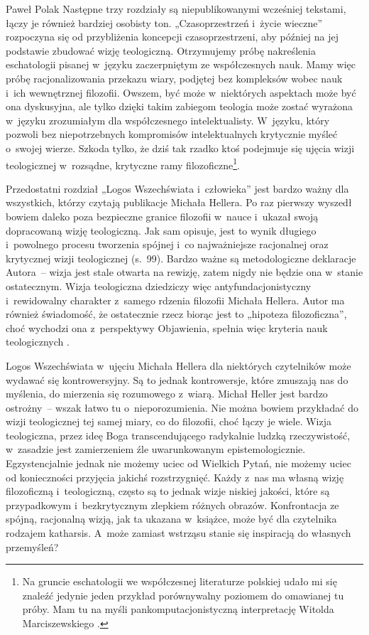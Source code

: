 \begin{recplenv}{Paweł Polak}
Następne trzy rozdziały są niepublikowanymi wcześniej tekstami, łączy je również bardziej osobisty ton.
„Czasoprzestrzeń i~życie wieczne” rozpoczyna się od przybliżenia koncepcji czasoprzestrzeni, aby później na jej
podstawie zbudować wizję teologiczną. Otrzymujemy próbę nakreślenia eschatologii pisanej w~języku zaczerpniętym ze
współczesnych nauk. Mamy więc próbę racjonalizowania przekazu wiary, podjętej bez kompleksów wobec nauk i~ich
wewnętrznej filozofii. Owszem, być może w~niektórych aspektach może być ona dyskusyjna, ale tylko dzięki takim zabiegom
teologia może zostać wyrażona w~języku zrozumiałym dla współczesnego intelektualisty. W~języku, który pozwoli bez
niepotrzebnych kompromisów intelektualnych krytycznie myśleć o~swojej wierze. Szkoda tylko, że dziś tak rzadko ktoś
podejmuje się ujęcia wizji teologicznej w~rozsądne, krytyczne ramy filozoficzne\footnote{Na gruncie eschatologii we
współczesnej literaturze polskiej udało mi się znaleźć jedynie jeden przykład porównywalny poziomem do omawianej tu
próby. Mam tu na myśli pankomputacjonistyczną interpretację Witolda Marciszewskiego
\parencite*{marciszewski_wszechswiat_1999}.
}.  

Przedostatni rozdział „Logos Wszechświata i~człowieka” jest bardzo ważny dla wszystkich, którzy czytają publikacje
Michała Hellera. Po raz pierwszy wyszedł bowiem daleko poza bezpieczne granice filozofii w~nauce i~ukazał swoją
dopracowaną wizję teologiczną. Jak sam opisuje, jest to wynik długiego i~powolnego procesu tworzenia spójnej i~co
najważniejsze racjonalnej oraz krytycznej wizji teologicznej (s.~99). Bardzo ważne są metodologiczne deklaracje
Autora~-- wizja jest stale otwarta na rewizję, zatem nigdy nie będzie ona w~stanie ostatecznym. Wizja teologiczna dziedziczy
więc antyfundacjonistyczny i~rewidowalny charakter z~samego rdzenia filozofii Michała Hellera. Autor ma również
świadomość, że ostatecznie rzecz biorąc jest to „hipoteza filozoficzna”, choć wychodzi ona z~perspektywy Objawienia,
spełnia więc kryteria nauk teologicznych
\parencite[s.~54]{dzidek_poznanie_2006}.

Logos Wszechświata w~ujęciu Michała Hellera dla niektórych czytelników może wydawać się kontrowersyjny. Są to jednak
kontrowersje, które zmuszają nas do myślenia, do mierzenia się rozumowego z~wiarą. Michał Heller jest bardzo
ostrożny~-- wszak łatwo tu o~nieporozumienia. Nie można bowiem przykładać do wizji teologicznej tej samej miary, co do filozofii,
choć łączy je wiele. Wizja teologiczna, przez ideę Boga transcendującego radykalnie ludzką rzeczywistość, w~zasadzie
jest zamierzeniem źle uwarunkowanym epistemologicznie. Egzystencjalnie jednak nie możemy uciec od Wielkich Pytań, nie
możemy uciec od konieczności przyjęcia jakichś rozstrzygnięć. Każdy z~nas ma własną wizję filozoficzną i~teologiczną,
często są to jednak wizje niskiej jakości, które są przypadkowym i~bezkrytycznym zlepkiem różnych obrazów. Konfrontacja
ze spójną, racjonalną wizją, jak ta ukazana w~książce, może być dla czytelnika rodzajem katharsis. A~może zamiast
wstrząsu stanie się inspiracją do własnych przemyśleń?


\end{recplenv}
